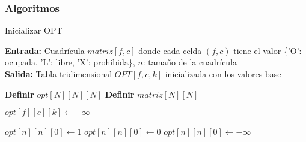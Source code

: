 \subsubsection{Algoritmos}
\begin{algorithm}
    \caption{Inicializar OPT}
    \label{alg:inicializarOPT}
    \textbf{Entrada:} Cuadrícula $matriz[f, c]$ donde cada celda $(f, c)$ tiene el valor \{'O': ocupada, 'L': libre, 'X': prohibida\}, $n$: tamaño de la cuadrícula \\
    \textbf{Salida:} Tabla tridimensional $OPT[f, c, k]$ inicializada con los valores base

    \begin{algorithmic}[1]
        \State \textbf{Definir} $opt[N][N][N]$ 
        \State \textbf{Definir} $matriz[N][N]$ 

         
             
                 
                    \State $opt[f][c][k] \gets -\infty$ 
                \EndFor
            \EndFor
        \EndFor
        
            \State $opt[n][n][0] \gets 1$ 
            \State $opt[n][n][0] \gets 0$ 
        \Else
            \State $opt[n][n][0] \gets -\infty$ 
        \EndIf
    \end{algorithmic}
\end{algorithm}


